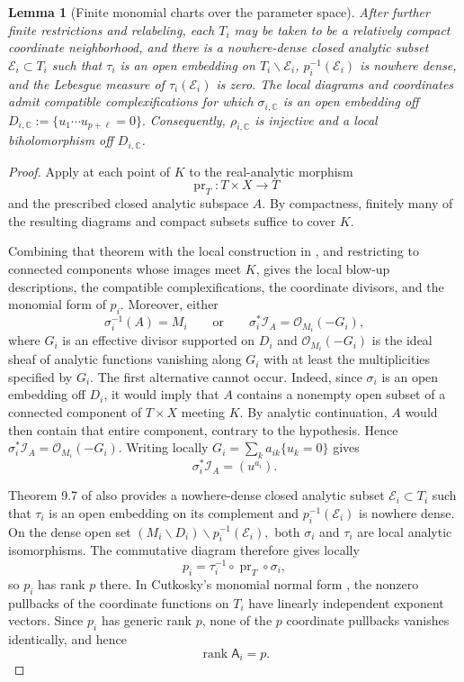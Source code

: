 \documentclass[reqno,11pt]{amsart}
\numberwithin{equation}{section}
\newtheorem{lemma}[theorem]{Lemma}
\theoremstyle{definition}
\theoremstyle{remark}
\begin{document}
\begin{lemma}[Finite monomial charts over the parameter space]
After further finite restrictions and relabeling, each $T_i$ may be taken
to be a relatively compact coordinate neighborhood, and there is a
nowhere-dense closed analytic subset $\mathcal E_i\subset T_i$ such that
$\tau_i$ is an open embedding on $T_i\smallsetminus\mathcal E_i$,
$p_i^{-1}(\mathcal E_i)$ is nowhere dense, and the Lebesgue measure of $\tau_i(\mathcal E_i)$ is zero.
The local diagrams and coordinates admit compatible complexifications for
which $\sigma_{i,\mathbb C}$ is an open embedding off
$
D_{i,\mathbb C}:=\{u_1\cdots u_{p+\ell}=0\}.
$
Consequently, $\rho_{i,\mathbb C}$ is injective and a local biholomorphism
off $D_{i,\mathbb C}$.
\end{lemma}

\begin{proof}
Apply \cite[Theorem~9.7]{Cutkosky2017} at each point of $K$ to the
real-analytic morphism
$$
\operatorname{pr}_T:T\times X\to T
$$
and the prescribed closed analytic subspace $A$. By compactness, finitely
many of the resulting diagrams and compact subsets suffice to cover $K$.

Combining that theorem with the local construction in
\cite[Proposition~9.6]{Cutkosky2017}, and restricting to connected
components whose images meet $K$, gives the local blow-up descriptions,
the compatible complexifications, the coordinate divisors, and the
monomial form of $p_i$. Moreover, either
$$
\sigma_i^{-1}(A)=M_i
\qquad\text{or}\qquad
\sigma_i^*\mathcal I_A=\mathcal O_{M_i}(-G_i),
$$
where $G_i$ is an effective divisor supported on $D_i$ and
 $\mathcal O_{M_i}(-G_i)$ is the ideal sheaf of analytic functions vanishing along $G_i$ with at least the multiplicities specified by $G_i$. The first alternative cannot occur. Indeed, since $\sigma_i$ is an open
embedding off $D_i$, it would imply that $A$ contains a nonempty open
subset of a connected component of $T\times X$ meeting $K$. By analytic
continuation, $A$ would then contain that entire component, contrary to the
hypothesis. Hence
$
\sigma_i^*\mathcal I_A=\mathcal O_{M_i}(-G_i).
$
Writing locally
$G_i=\sum_k a_{ik}\{u_k=0\}$ gives
$$\sigma_i^*\mathcal I_A=(u^{a_i}).$$

Theorem 9.7 of \cite{Cutkosky2017} also provides a nowhere-dense closed analytic subset
$\mathcal E_i\subset T_i$ such that $\tau_i$ is an open embedding on its
complement and $p_i^{-1}(\mathcal E_i)$ is nowhere dense. On the dense open
set
$
(M_i\smallsetminus D_i)\smallsetminus p_i^{-1}(\mathcal E_i),
$
both $\sigma_i$ and $\tau_i$ are local analytic isomorphisms. The
commutative diagram therefore gives locally
$$
p_i
=
\tau_i^{-1}\circ\operatorname{pr}_T\circ\sigma_i,
$$
so $p_i$ has rank $p$ there. In Cutkosky's monomial normal form
\cite[Definition~3.2]{Cutkosky2017}, the nonzero pullbacks of the coordinate
functions on $T_i$ have linearly independent exponent vectors. Since
$p_i$ has generic rank $p$, none of the $p$ coordinate pullbacks vanishes
identically, and hence
$$
\operatorname{rank}\mathsf A_i=p.
$$


\end{proof}
\end{document}

